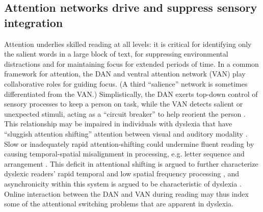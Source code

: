 \subsection{Attention networks drive and suppress sensory integration} 
Attention underlies skilled reading at all levels: it is critical for identifying only the salient words in a large block of text, for suppressing environmental distractions and for maintaining focus for extended periods of time. In a common framework for attention, the DAN and ventral attention network (VAN) play collaborative roles for guiding focus. (A third ``salience'' network is sometimes differentiated from the VAN.) Simplistically, the DAN exerts top-down control of sensory processes to keep a person on task, while the VAN detects salient or unexpected stimuli, acting as a ``circuit breaker'' to help reorient the person \citep{Corbetta2002, Vossel2014}. This relationship may be impaired in individuals with dyslexia that have ``sluggish attention shifting'' attention between visual and auditory modality \citep{Harrar2014}. Slow or inadequately rapid attention-shifting could undermine fluent reading by causing temporal-spatial misalignment in processing, e.g. letter sequence and arrangement \citep{Lallier2009}. This deficit in attentional shifting is argued to further characterize dyslexic readers’ rapid temporal and low spatial frequency processing \citep{Witton1998}, and asynchronicity within this system is argued to be characteristic of dyslexia \citep{Lallier2009}. Online interaction between the DAN and VAN during reading may thus index some of the attentional switching problems that are apparent in dyslexia. 

